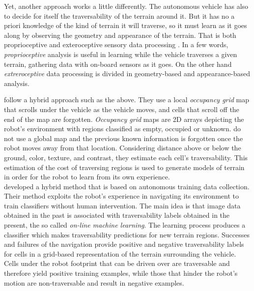 \documentclass[12pt,a4paper,table,dvipsnames,tikz]{report}
\newcommand{\term}{\textit}
\newcommand{\acronym}{\MakeUppercase}
\begin{document}
	Yet, another approach works a little differently. The autonomous 
	vehicle has also to decide for itself the traversability of the terrain 
	around it. But it has no a priori knowledge of the kind of terrain it will 
	traverse, so it must learn as it goes along by observing the geometry and 
	appearance of the terrain. That is both proprioceptive and exteroceptive sensory 
	data processing \citep{Papadakis}. In a few words, \term{proprioceptive} analysis 
	is useful in learning while the vehicle traverses a given terrain, gathering data 
	with on-board sensors as it goes. On the other hand \term{extreroceptive} data 
	processing is divided in geometry-based and appearance-based analysis. 
	\par
	\citet{Shneier} follow a hybrid approach such as the above. They use a local 
	\term{occupancy grid} map that scrolls under the vehicle as the vehicle moves,
	and cells that scroll off the end of the map are forgotten. 
	\term{Occupancy grid} maps \citep{Moravec} are \acronym{2d} arrays depicting the 
	robot’s environment with regions classified as empty, occupied or unknown.
	\citet{Shneier} do not 
	use a global map and the previous known information is forgotten once the robot 
	moves away from that location. Considering distance above or below the ground, 
	color, texture, and contrast, they estimate each cell’s traversability. 
	This estimation of the cost of traversing regions is used to generate models of 
	terrain in order for the robot to learn from its own experience.
	\\
	
	\citet{Kim} developed a hybrid method that is based on autonomous training data 
	collection. Their method
	exploits the robot’s experience in navigating its environment to train 
	classifiers without human intervention. The main idea is that image 
	data obtained in the past is associated with traversability labels 
	obtained in the present, the so called \term{on-line machine learning}. The 
	learning process produces a classifier which makes traversability 
	predictions for new terrain regions. Successes and failures of the navigation 
	provide positive and negative traversability labels for cells in a 
	grid-based representation of the terrain surrounding the vehicle. Cells under the 
	robot footprint that can be driven over are traversable and therefore yield 
	positive training examples, while those that hinder the robot’s motion are 
	non-traversable and result in negative examples.
	\\
	
\end{document}
